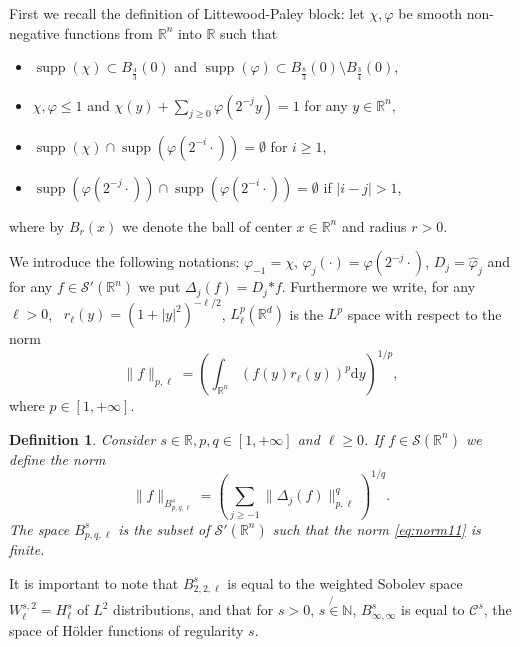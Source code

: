 \documentclass[a4paper,10pt]{article}
\newcommand{\asterisk}{\mathord{*}}
\newcommand{\mathd}{\mathrm{d}}
\newcommand{\tmop}[1]{\ensuremath{\operatorname{#1}}}
\newtheorem{definition}[theorem]{Definition}
\begin{document}
First we recall the definition of Littewood-Paley block: let $\chi, \varphi$
be smooth non-negative functions from $\mathbb{R}^n$ into $\mathbb{R}$ such
that
\begin{itemize}
  \item $\tmop{supp} (\chi) \subset B_{\frac{4}{3}} (0)$ and $\tmop{supp}
  (\varphi) \subset B_{\frac{8}{3}} (0) \setminus B_{\frac{3}{4}} (0)$,
  
  \item $\chi, \varphi \leq 1$ and $\chi (y) + \sum_{j \geq 0} \varphi (2^{-
  j} y) = 1$ for any $y \in \mathbb{R}^n$,
  
  \item $\tmop{supp} (\chi) \cap \tmop{supp} (\varphi (2^{- i} \cdot)) =
  \emptyset$ for $i \geqslant 1$,
  
  \item $\tmop{supp} (\varphi (2^{- j} \cdot)) \cap \tmop{supp} (\varphi (2^{-
  i} \cdot)) = \emptyset$ if $| i - j | > 1$,
\end{itemize}
where by $B_r (x)$ we denote the ball of center $x \in \mathbb{R}^n$ and
radius $r > 0$.

We introduce the following notations: $\varphi_{- 1} = \chi$, $\varphi_j
(\cdot) = \varphi (2^{- j} \cdot)$, $D_j = \hat{\varphi}_j$ and for any $f \in
\mathcal{S}' (\mathbb{R}^n)$ we put $\Delta_j (f) = D_j \asterisk f$.
Furthermore we write, for any $\ell > 0$, \ $r_{\ell} (y) = (1 + | y |^2)^{-
\ell / 2}$, $L^p_{\ell} (\mathbb{R}^d)$ is the $L^p$ space with respect to the
norm
\[ \| f \|_{p, \ell} = \left( \int_{\mathbb{R}^n} (f (y) r_{\ell} (y))^p
   \mathd y \right)^{1 / p}, \]
where $p \in [1, + \infty]$.

\begin{definition}
  \label{definition_Besov}Consider $s \in \mathbb{R}, p, q \in [1, + \infty]$
  and $\ell \geq 0$. If $f \in \mathcal{S} (\mathbb{R}^n)$ we define the norm
  \begin{equation}
    \| f \|_{B^s_{p, q, \ell}} = \left( \sum_{j \geq - 1} \| \Delta_j (f)
    \|_{p, \ell}^q \right)^{1 / q} . \label{eq:norm11}
  \end{equation}
  The space $B^s_{p, q, \ell}$ is the subset of $\mathcal{S}' (\mathbb{R}^n)$
  such that the norm {\eqref{eq:norm11}} is finite. 
\end{definition}

\begin{remark}
  It is important to note that $B^s_{2, 2, \ell}$ is equal to the weighted
  Sobolev space $W^{s, 2}_{\ell} = H^s_{\ell}$ of $L^2$ distributions, and
  that for $s > 0$, $s \not{\in} \mathbb{N}$, $B^s_{\infty, \infty}$ is equal
  to $\mathcal{C}^s$, the space of H{\"o}lder functions of regularity $s$. 
\end{remark}
\end{document}

